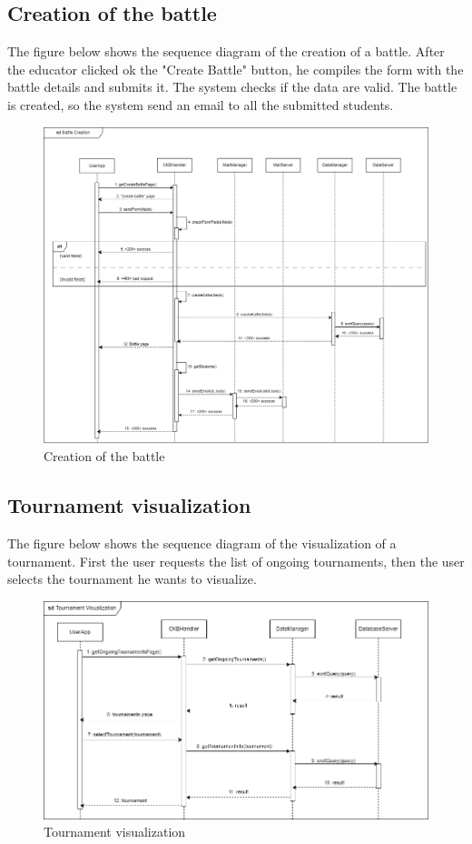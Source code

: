 \subsection{Creation of the battle}
The figure below shows the sequence diagram of the creation of a battle. After the educator clicked ok the "Create Battle" button, he compiles the form
 with the battle details and submits it. The system checks if the data are valid. The battle is created, so the system send an email to all 
 the submitted students.  
 
\begin{figure}[H]
    \centering
    \includegraphics[width=1\textwidth]{images/seq_diagrams/battle_creation_DD.png}
    \caption{Creation of the battle}
\end{figure}
\clearpage

\subsection{Tournament visualization}
The figure below shows the sequence diagram of the visualization of a tournament. First the user requests the list of ongoing tournaments, 
then the user selects the tournament he wants to visualize.\\
\begin{figure}[H]
    \centering
    \includegraphics[width=1\textwidth]{images/seq_diagrams/tournament_visualization_dd.png}
    \caption{Tournament visualization}
\end{figure}
\clearpage

